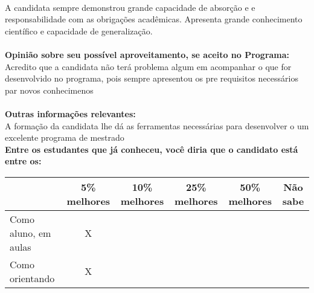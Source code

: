 \documentclass[11pt]{article}
\begin{document}
\\A candidata sempre demonstrou grande capacidade de absorção e e responsabilidade com as obrigações acadêmicas. Apresenta grande conhecimento científico e capacidade de generalização.\\
\\
\textbf{Opinião sobre seu possível aproveitamento, se aceito no Programa:}
\\Acredito que a candidata não terá problema algum em acompanhar o que for desenvolvido no programa, pois sempre apresentou os pre requisitos necessários par novos conhecimenos\\ 
\\
\textbf{Outras informações relevantes:} \\A formação da  candidata lhe dá as ferramentas necessárias para desenvolver o um excelente programa de mestrado
\\[0.3cm]
\textbf{Entre os estudantes que já conheceu, você diria que o candidato está entre os:}
\\
\begin{tabular}{|l|c|c|c|c|c|}
\hline
 & 5\% melhores & 10\% melhores & 25\% melhores & 50\% melhores & Não sabe \\
\hline
Como aluno, em aulas & X &  &  &  & \\
\hline
Como orientando & X &  &  &  & \\
\hline
\end{tabular}
\end{document}
